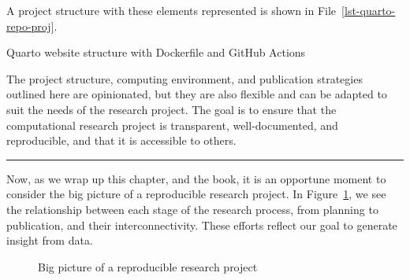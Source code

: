 \documentclass[
  letterpaper,
]{latex/krantz}
\theoremstyle{definition}
\theoremstyle{remark}
\begin{document}
A project structure with these elements represented is shown in
File~\ref{lst-quarto-repo-proj}.

\begin{codelisting}

\caption{\label{lst-quarto-repo-proj}Quarto website structure with
Dockerfile and GitHub Actions}


\end{codelisting}%

The project structure, computing environment, and publication strategies
outlined here are opinionated, but they are also flexible and can be
adapted to suit the needs of the research project. The goal is to ensure
that the computational research project is transparent, well-documented,
and reproducible, and that it is accessible to others.

\begin{center}\rule{0.5\linewidth}{0.5pt}\end{center}

Now, as we wrap up this chapter, and the book, it is an opportune moment
to consider the big picture of a reproducible research project. In
Figure~\ref{fig-big-picture}, we see the relationship between each stage
of the research process, from planning to publication, and their
interconnectivity. These efforts reflect our goal to generate insight
from data.

\begin{figure}[H]


\caption{\label{fig-big-picture}Big picture of a reproducible research
project}

\end{figure}%
\end{document}

